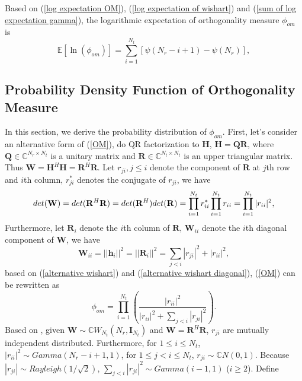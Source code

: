 \documentclass[12pt, draftclsnofoot, onecolumn]{IEEEtran}
\begin{document}
Based on (\ref{log expectation OM}), (\ref{log expectation of wishart}) and (\ref{sum of log expectation gamma}), the logarithmic expectation of orthogonality measure $\phi_{om}$ is 
\begin{equation}
\mathbb{E}[\ln(\phi_{om})]=\sum_{i=1}^{N_{t}}[\psi(N_{r}-i+1)-\psi(N_{r})],
\label{final log expectation OM}
\end{equation}
\subsection{Probability Density Function of Orthogonality Measure}
In this section, we derive the probability distribution of $\phi_{om}$. First, let's consider an alternative form of (\ref{OM}), do QR factorization to $\mathbf{H}$, $\mathbf{H}=\mathbf{Q}\mathbf{R}$\cite{watkins2004fundamentals}, where $\mathbf{Q}\in\mathbb{C}^{N_{r}\times N_{t}}$ is a unitary matrix and $\mathbf{R}\in\mathbb{C}^{N_{t}\times N_{t}}$ is an upper triangular matrix. Thus $\mathbf{W}=\mathbf{H}^{H}\mathbf{H}=\mathbf{R}^{H}\mathbf{R}$. Let $r_{ji}, j\leq i$ denote the component of $\mathbf{R}$ at $j$th row and $i$th column, $r^{*}_{ji}$ denotes the conjugate of $r_{ji}$, we have
\begin{equation}
det(\mathbf{W})=det(\mathbf{R}^{H}\mathbf{R})=det(\mathbf{R}^{H})det(\mathbf{R})\\=\prod_{i=1}^{N_{t}}r_{ii}^{*}\prod_{i=1}^{N_{t}}r_{ii}=\prod_{i=1}^{N_{t}}|r_{ii}|^{2},
\label{alternative wishart}
\end{equation}
Furthermore, let $\mathbf{R}_{i}$ denote the $i$th column of $\mathbf{R}$, $\mathbf{W}_{ii}$ denote the $i$th diagonal component of $\mathbf{W}$, we have
\begin{equation}
\mathbf{W}_{ii}=||\mathbf{h}_{i}||^{2}=||\mathbf{R}_{i}||^{2}=\sum_{j<i}|r_{ji}|^{2}+|r_{ii}|^{2},
\label{alternative wishart diagonal}
\end{equation}
based on (\ref{alternative wishart}) and (\ref{alternative wishart diagonal}), (\ref{OM}) can be rewritten as 
\begin{equation}
\phi_{om}=\prod_{i=1}^{N_{t}}(\frac{|r_{ii}|^{2}}{|r_{ii}|^{2}+\sum_{j<i}|r_{ji}|^{2}}).
\label{alternative OM}
\end{equation}
Based on \cite{nagar2011expectations}, given $\mathbf{W}\sim \mathbb{C}W_{N_{t}}(N_{r}, \mathbf{I}_{N_{t}})$ and $\mathbf{W}=\mathbf{R}^{H}\mathbf{R}$, $r_{ji}$ are mutually independent distributed. Furthermore, for $1\leq i\leq N_{t}$, $|r_{ii}|^{2}\sim Gamma(N_{r}-i+1,1)$, for $1\leq j<i\leq N_{t}$, $r_{ji}\sim \mathbb{C}N(0,1)$. Because $|r_{ji}|\sim Rayleigh(1/\sqrt{2})$, $\sum_{j<i}|r_{ji}|^{2}\sim Gamma(i-1, 1)$ ($i\geq 2$). Define 
\end{document}
